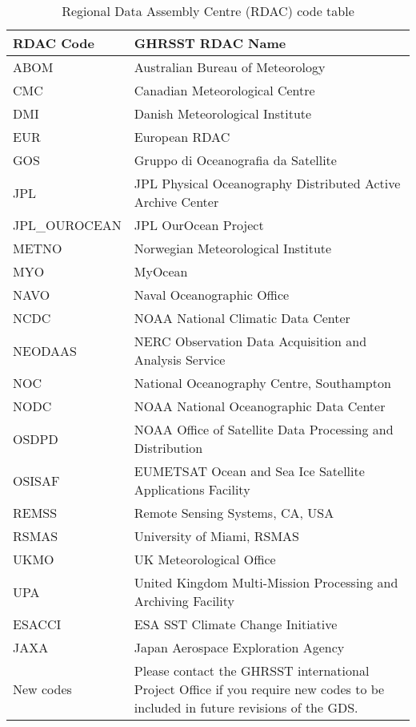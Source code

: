 \begin{table}[h]
\centering
\caption{Regional Data Assembly Centre (RDAC) code table}
\label{tab:RDAC code table}
\begin{tabular}{|p{}|p{}|}
\hline
\rowcolor{lightgray}
RDAC Code & GHRSST RDAC Name \\ \hline
ABOM & Australian Bureau of Meteorology \\ \hline
CMC & Canadian Meteorological Centre \\ \hline
DMI & Danish Meteorological Institute \\ \hline
EUR & European RDAC \\ \hline
GOS & Gruppo di Oceanografia da Satellite \\ \hline
JPL & JPL Physical Oceanography Distributed Active Archive Center \\ \hline
JPL\_OUROCEAN & JPL OurOcean Project \\ \hline
METNO & Norwegian Meteorological Institute \\ \hline
MYO & MyOcean \\ \hline
NAVO & Naval Oceanographic Office \\ \hline
NCDC & NOAA National Climatic Data Center \\ \hline
NEODAAS & NERC Observation Data Acquisition and Analysis Service \\ \hline
NOC & National Oceanography Centre, Southampton \\ \hline
NODC & NOAA National Oceanographic Data Center \\ \hline
OSDPD & NOAA Office of Satellite Data Processing and Distribution \\ \hline
OSISAF & EUMETSAT Ocean and Sea Ice Satellite Applications Facility \\ \hline
REMSS & Remote Sensing Systems, CA, USA \\ \hline
RSMAS & University of Miami, RSMAS \\ \hline
UKMO & UK Meteorological Office \\ \hline
UPA & United Kingdom Multi-Mission Processing and Archiving Facility \\ \hline
ESACCI & ESA SST Climate Change Initiative \\ \hline
JAXA & Japan Aerospace Exploration Agency \\ \hline
New codes & Please contact the GHRSST international Project Office if you require new
codes to be included in future revisions of the GDS. \\ \hline

\end{tabular}
\end{table}


